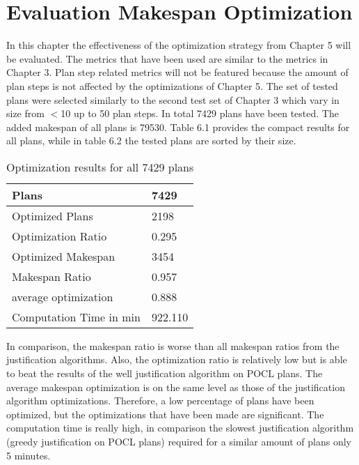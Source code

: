 \chapter{Evaluation Makespan Optimization}

In this chapter the effectiveness of the optimization strategy from Chapter 5 will be evaluated.
The metrics that have been used are similar to the metrics in Chapter 3.
Plan step related metrics will not be featured because the amount of plan steps is not affected 
by the optimizations of Chapter 5.
The set of tested plans were selected similarly to the second test set of Chapter 3 which vary in size
from $<$10 up to 50 plan steps. In total 7429 plans have been tested.
The added makespan of all plans is 79530. 
Table 6.1 provides the compact results for all plans, while in table 6.2 the tested plans are sorted by their size.


\begin{table}[h]
    \begin{tabular}{ll}
    \hline
    Plans                   & 7429    \\ \hline
    Optimized Plans         & 2198    \\
    Optimization Ratio      & 0.295   \\
    Optimized Makespan      & 3454    \\
    Makespan Ratio          & 0.957   \\
    average optimization    & 0.888   \\
    Computation Time in min & 922.110
    \end{tabular}
    \caption{Optimization results for all 7429 plans}
\end{table}

In comparison, the makespan ratio is worse than all makespan ratios from the justification algorithms.
Also, the optimization ratio is relatively low but is able to beat the results of the well justification algorithm on POCL plans.
The average makespan optimization is on the same level as those of the justification algorithm optimizations.
Therefore, a low percentage of plans have been optimized, but the optimizations that have been made are significant.
The computation time is really high, in comparison the slowest justification algorithm (greedy justification on POCL plans) 
required for a similar amount of plans only 5 minutes.

